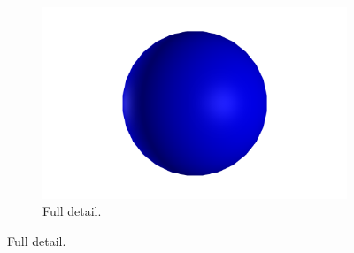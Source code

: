 \begin{figure}
\begin{center}
\begin{subfigure}{0.3\textwidth}
      \includegraphics[width=\textwidth]{assets/images/lod/3}
      \caption{Full detail.}
      \label{fig:lod_3}
    \end{subfigure}
    

\end{center}
\end{figure}
